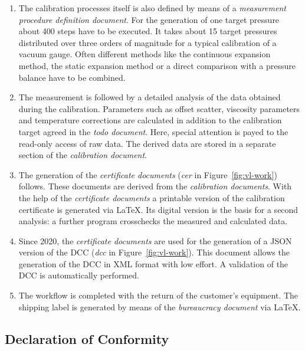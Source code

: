 \documentclass[3p,times,procedia]{elsarticle}
\begin{document}
\begin{enumerate}
\item The calibration processes itself is also defined by means of a
  \emph{measurement procedure definition document}.  For the
  generation of one target pressure about 400 steps have to be
  executed. It takes about 15 target pressures distributed over three
  orders of magnitude for a typical calibration of a vacuum
  gauge. Often different methods like the continuous expansion method,
  the static expansion method or a direct comparison with a pressure
  balance have to be combined.  %
  
\item The measurement is followed by a detailed analysis of the data
  obtained during the calibration. Parameters such as offset scatter,
  viscosity parameters and temperature corrections are calculated in addition to the
  calibration target agreed in the \emph{todo document}.
  Here, special attention is payed to the read-only access of raw
  data. The derived data are stored in a separate section of the
  \emph{calibration document}.
  
\item The generation of the \emph{certificate documents} (\emph{cer}
  in Figure~\ref{fig:vl-work}) follows.  These documents are derived
  from the \emph{calibration documents}. With the help of the
  \emph{certificate documents} a printable version of the calibration
  certificate is generated via \LaTeX. Its digital version is the
  basis for a second analysis: a further program crosschecks the
  measured and calculated data.
  
\item Since 2020, the \emph{certificate documents} are used for the
  generation of a JSON version of the DCC (\emph{dcc} in
  Figure~\ref{fig:vl-work}). This document allows the generation of the DCC
  in XML format with low effort. A validation of the DCC is automatically performed.

\item The workflow is completed with the return of the customer's
  equipment. The shipping label is generated by means of the 
  \emph{bureaucracy document} via \LaTeX.
\end{enumerate}



\subsection{Declaration of Conformity}
\end{document}
